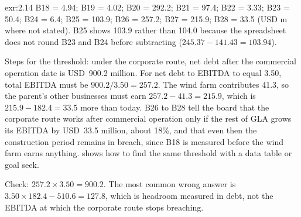 \begin{solution}{exr:2.14}
B18 = 4.94\x; B19 = 4.02\x; B20 = 292.2; B21 = 97.4; B22 = 3.33\x; B23 = 50.4\bps; B24 = 6.4\bps; B25 = 103.9\bps; B26 = 257.2; B27 = 215.9; B28 = 33.5 (USD m where not stated). B25 shows 103.9 rather than 104.0 because the spreadsheet does not round B23 and B24 before subtracting ($245.37 - 141.43 = 103.94$).

Steps for the threshold: under the corporate route, net debt after the commercial operation date is USD~900.2 million. For net debt to EBITDA to equal 3.50\x, total EBITDA must be $900.2/3.50 = 257.2$. The wind farm contributes 41.3, so the parent's other businesses must earn $257.2 - 41.3 = 215.9$, which is $215.9 - 182.4 = 33.5$ more than today. B26 to B28 tell the board that the corporate route works after commercial operation only if the rest of GLA grows its EBITDA by USD~33.5 million, about 18\%, and that even then the construction period remains in breach, since B18 is measured before the wind farm earns anything.  shows how to find the same threshold with a data table or goal seek.

Check: $257.2 \times 3.50 = 900.2$. The most common wrong answer is $3.50 \times 182.4 - 510.6 = 127.8$, which is headroom measured in debt, not the EBITDA at which the corporate route stops breaching.
\end{solution}

